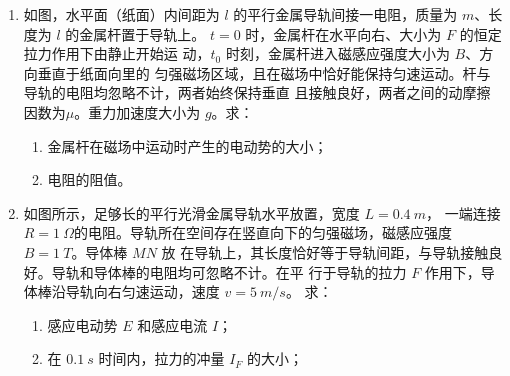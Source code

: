 


\begin{enumerate}
\item
{}
如图，水平面（纸面）内间距为 $ l $
的平行金属导轨间接一电阻，质量为 $ m $、长度为 $ l $ 的金属杆置于导轨上。
$ t=0 $ 时，金属杆在水平向右、大小为 $ F $ 的恒定拉力作用下由静止开始运
动，$ t_{0} $ 时刻，金属杆进入磁感应强度大小为 $ B $、方向垂直于纸面向里的
匀强磁场区域，且在磁场中恰好能保持匀速运动。杆与导轨的电阻均忽略不计，两者始终保持垂直
且接触良好，两者之间的动摩擦因数为$ \mu $。重力加速度大小为 $ g $。求：
\begin{enumerate}
\item
金属杆在磁场中运动时产生的电动势的大小；
\item 
电阻的阻值。
\end{enumerate}
\begin{figure}[h!]
\flushright

\end{figure}




\item 
{}
如图所示，足够长的平行光滑金属导轨水平放置，宽度 $ L=0.4 \ m $，
一端连接 $ R=1 \ \Omega $的电阻。导轨所在空间存在竖直向下的匀强磁场，磁感应强度 $ B=1 \ T $。导体棒 $ MN $ 放
在导轨上，其长度恰好等于导轨间距，与导轨接触良好。导轨和导体棒的电阻均可忽略不计。在平
行于导轨的拉力 $ F $ 作用下，导体棒沿导轨向右匀速运动，速度 $ v=5 \ m /s $。
求：
\begin{enumerate}
\item
感应电动势 $ E $ 和感应电流 $ I $；
\item 
在 $ 0.1 \ s $ 时间内，拉力的冲量 $ I_{F} $ 的大小；




\end{enumerate}
\end{enumerate}
